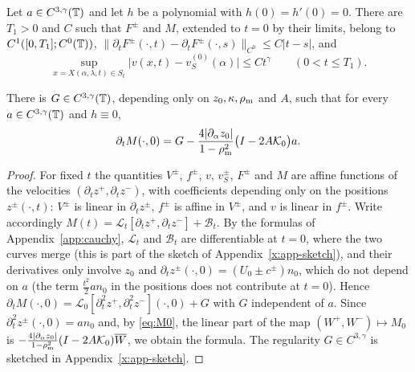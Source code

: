 \begin{lemma}\label{lem:timereg}
Let $a\in C^{3,\gamma}(\mathbb{T})$ and let $h$ be a polynomial with $h(0)=h'(0)=0$. There are $T_1>0$ and $C$ such that $F^\pm$ and $M$, extended to $t=0$ by their limits, belong to $C^1([0,T_1];C^0(\mathbb{T}))$,
$\|\partial_tF^\pm(\cdot,t)-\partial_tF^\pm(\cdot,s)\|_{C^0}\le C|t-s|$, and
\begin{equation}\label{eq:v-strip}
\sup_{x=X(\alpha,\lambda,t)\in S_t}\big|v(x,t)-v_S^{(0)}(\alpha)\big|\le Ct^\gamma\qquad (0<t\le T_1).
\end{equation}
\end{lemma}

\begin{lemma}\label{lem:accel}
There is $G\in C^{3,\gamma}(\mathbb{T})$, depending only on $z_0,\kappa,\rho_{\mathrm m}$ and $A$, such that for every $a\in C^{3,\gamma}(\mathbb{T})$ and $h\equiv0$,
\[
\partial_tM(\cdot,0)=G-\frac{4|\partial_\alpha z_0|}{1-\rho_{\mathrm m}^2}\big(I-2A\mathcal{K}_0\big)a .
\]
\end{lemma}

\begin{proof}
For fixed $t$ the quantities $V^\pm$, $f^\pm$, $v$, $v_S^\pm$, $F^\pm$ and $M$ are affine functions of the velocities $(\partial_tz^+,\partial_tz^-)$, with coefficients depending only on the positions
$z^\pm(\cdot,t)$: $V^\pm$ is linear in $\partial_tz^\pm$, $f^\pm$ is affine in $V^\pm$, and $v$ is linear in $f^\pm$. Write accordingly $M(t)=\mathcal L_t[\partial_tz^+,\partial_tz^-]+\mathcal B_t$.
By the formulas of Appendix~\ref{app:cauchy}, $\mathcal L_t$ and $\mathcal B_t$ are differentiable at $t=0$, where the two curves merge (this is part of the sketch of
Appendix~\ref{x:app-sketch}), and their derivatives only involve $z_0$ and $\partial_tz^\pm(\cdot,0)=(U_0\pm c^\pm)n_0$, which do not
depend on $a$ (the term $\frac{t^2}2an_0$ in the positions does not contribute at $t=0$). Hence $\partial_tM(\cdot,0)=\mathcal L_0[\partial_t^2z^+,\partial_t^2z^-](\cdot,0)+G$ with $G$ independent of $a$. Since
$\partial_t^2z^\pm(\cdot,0)=an_0$ and, by \eqref{eq:M0}, the linear part of the map $(W^+,W^-)\mapsto M_0$ is $-\frac{4|\partial_\alpha z_0|}{1-\rho_{\mathrm m}^2}(I-2A\mathcal{K}_0)\overline W$, we obtain the formula.
The regularity $G\in C^{3,\gamma}$ is sketched in Appendix~\ref{x:app-sketch}.
\end{proof}

